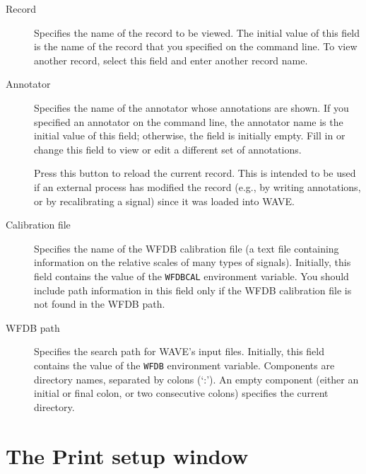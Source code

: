 \documentclass[twoside]{book}
\newcommand{\button}[1]{\cornersize{2}\ovalbox{\rule[-.3mm]{0cm}{2.5mm}\small\sf ~#1~}}
\newcommand{\WAVE}{{\sf WAVE}\xspace}
\begin{document}
\begin{description}
\item[{\sf Record}]
Specifies the name of the record to be viewed.  The initial value of this field
is the name of the record that you specified on the command line.  To view
another record, select this field and enter another record name.

\item[{\sf Annotator}]
Specifies the name of the annotator whose annotations are shown.  If you
specified an annotator on the command line, the annotator name is the initial
value of this field; otherwise, the field is initially empty.  Fill in or
change this field to view or edit a different set of annotations.

\item[\button{Reload}]
Press this button to reload the current record.  This is intended to be used
if an external process has modified the record (e.g., by writing annotations,
or by recalibrating a signal) since it was loaded into \WAVE{}.

\item[{\sf Calibration file}]
Specifies the name of the WFDB calibration file (a text file containing
information on the relative scales of many types of signals).
Initially, this field contains the value of the {\tt WFDBCAL}
environment variable.
You should include path information in this field only if the WFDB
calibration file is not found in the WFDB path.

\item[{\sf WFDB path}]
Specifies the search path for \WAVE{}'s input files.
Initially, this field contains the value of the {\tt WFDB} environment
variable.
Components are
directory names, separated by colons (`:').  An empty component (either an
initial or final colon, or two consecutive colons) specifies the current
directory.
\end{description}

\section{The {\sf Print setup} window}
\end{document}
